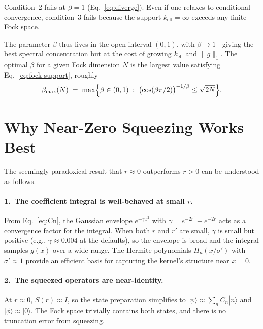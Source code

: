 \documentclass[11pt]{article}
\begin{document}
Condition~2 fails at $\beta = 1$ (Eq.~\ref{eq:diverge}).
Even if one relaxes to conditional convergence, condition~3 fails
because the support $k_{\mathrm{eff}} = \infty$ exceeds any finite
Fock space.

The parameter $\beta$ thus lives in the open interval $(0,1)$, with
$\beta \to 1^-$ giving the best spectral concentration but at the
cost of growing $k_{\mathrm{eff}}$ and $\|g\|_1$.  The optimal $\beta$
for a given Fock dimension $N$ is the largest value satisfying
Eq.~\eqref{eq:fock-support}, roughly
\begin{equation}\label{eq:beta-opt}
  \beta_{\max}(N) \;=\; \max\Bigl\{\beta \in (0,1)
  \;:\; \bigl(\cos(\beta\pi/2)\bigr)^{-1/\beta} \le \sqrt{2N}\Bigr\}.
\end{equation}

\section{Why Near-Zero Squeezing Works Best}

The seemingly paradoxical result that $r \approx 0$ outperforms $r > 0$
can be understood as follows.

\paragraph{1.\ The coefficient integral is well-behaved at small $r$.}
From Eq.~\eqref{eq:Cn}, the Gaussian envelope $e^{-\gamma x^2}$ with
$\gamma = e^{-2r'} - e^{-2r}$ acts as a convergence factor for the
integral.  When both $r$ and $r'$ are small, $\gamma$ is small but positive
(e.g., $\gamma \approx 0.004$ at the defaults), so the envelope is broad
and the integral samples $g(x)$ over a wide range.  The Hermite polynomials
$H_n(x/\sigma')$ with $\sigma' \approx 1$ provide an efficient basis for
capturing the kernel's structure near $x = 0$.

\paragraph{2.\ The squeezed operators are near-identity.}
At $r \approx 0$, $S(r) \approx I$, so the state preparation simplifies to
$|\psi\rangle \approx \sum_n C_n |n\rangle$ and
$|\phi\rangle \approx |0\rangle$.
The Fock space trivially contains both states, and there is no truncation
error from squeezing.
\end{document}
